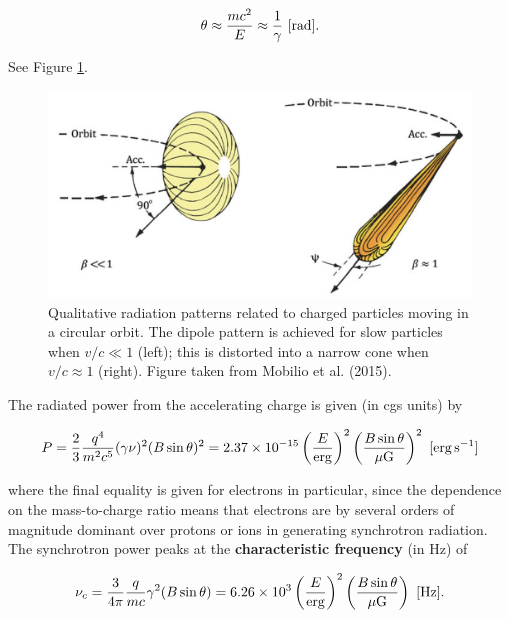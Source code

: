 \documentclass[a4paper,10pt]{article}
\begin{document}
\begin{align*}
    \theta \approx \frac{mc^2}{E} \approx \frac{1}{\gamma} ~ [{\rm rad}].
\end{align*}

{\noindent}See Figure \ref{fig:synchrotronorbits}.

\begin{figure}[h]
    \centering
    \includegraphics[width=12cm]{figures/SynchrotronOrbits.png}
    \caption{\footnotesize{Qualitative radiation patterns related to charged particles moving in a circular orbit. The dipole pattern is achieved for slow particles when $v/c\ll1$ (left); this is distorted into a narrow cone when $v/c\approx1$ (right). Figure taken from Mobilio et al. (2015).}}
    \label{fig:synchrotronorbits}
\end{figure}

{\noindent}The radiated power from the accelerating charge is given (in cgs units) by

\begin{align*}
    P = \frac{2}{3}\frac{q^4}{m^2c^5} (\gamma\nu)^2 (B\sin\theta)^2 = 2.37\times10^{-15} \left(\frac{E}{{\rm erg}}\right)^2 \left(\frac{B\sin\theta}{\mu{\rm G}}\right)^2 ~ [{\rm erg\,s^{-1}}]
\end{align*}

{\noindent}where the final equality is given for electrons in particular, since the dependence on the mass-to-charge ratio means that electrons are by several orders of magnitude dominant over protons or ions in generating synchrotron radiation. The synchrotron power peaks at the \textbf{characteristic frequency} (in Hz) of

\begin{align*}
    \nu_c = \frac{3}{4\pi}\frac{q}{mc}\gamma^2(B\sin\theta) = 6.26\times10^3 \left(\frac{E}{{\rm erg}}\right)^2 \left(\frac{B\sin\theta}{\mu{\rm G}}\right) ~ [{\rm Hz}].
\end{align*}
\end{document}
